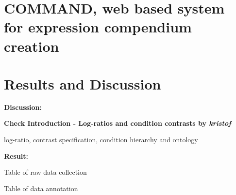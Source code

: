 \section{COMMAND, web based system for expression compendium creation}





\section{Results and Discussion}

\textbf{Discussion: }

\textbf{Check Introduction - Log-ratios and condition contrasts by 
\textit{kristof}}

log-ratio, contrast specification, condition hierarchy and ontology


\textbf{Result: }

Table of raw data collection

Table of data annotation





\cleardoublepage


